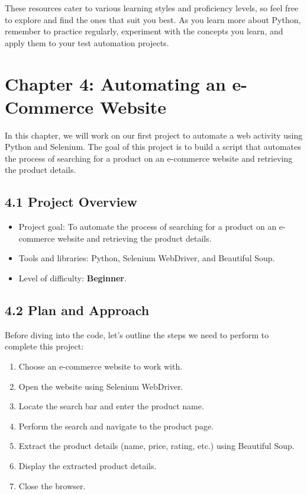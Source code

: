 \documentclass[
  paper=a4,
  ,captions=tableheading
]{scrartcl}
\providecommand{\tightlist}{%
  \setlength{\itemsep}{0pt}\setlength{\parskip}{0pt}}
\begin{document}
These resources cater to various learning styles and proficiency levels,
so feel free to explore and find the ones that suit you best. As you
learn more about Python, remember to practice regularly, experiment with
the concepts you learn, and apply them to your test automation projects.

\hypertarget{chapter-4-automating-an-e-commerce-website}{%
\chapter{Chapter 4: Automating an e-Commerce
Website}\label{chapter-4-automating-an-e-commerce-website}}

In this chapter, we will work on our first project to automate a web
activity using Python and Selenium. The goal of this project is to build
a script that automates the process of searching for a product on an
e-commerce website and retrieving the product details.

\hypertarget{project-overview}{%
\section{4.1 Project Overview}\label{project-overview}}

\begin{itemize}
\tightlist
\item
  Project goal: To automate the process of searching for a product on an
  e-commerce website and retrieving the product details.
\item
  Tools and libraries: Python, Selenium WebDriver, and Beautiful Soup.
\item
  Level of difficulty: \textbf{Beginner}.
\end{itemize}

\hypertarget{plan-and-approach}{%
\section{4.2 Plan and Approach}\label{plan-and-approach}}

Before diving into the code, let's outline the steps we need to perform
to complete this project:

\begin{enumerate}
\def\labelenumi{\arabic{enumi}.}
\tightlist
\item
  Choose an e-commerce website to work with.
\item
  Open the website using Selenium WebDriver.
\item
  Locate the search bar and enter the product name.
\item
  Perform the search and navigate to the product page.
\item
  Extract the product details (name, price, rating, etc.) using
  Beautiful Soup.
\item
  Display the extracted product details.
\item
  Close the browser.
\end{enumerate}
\end{document}
